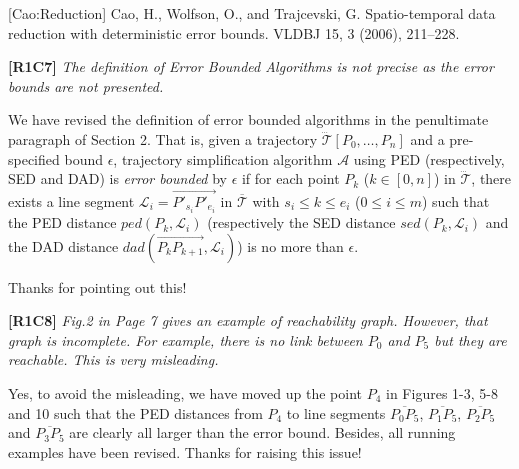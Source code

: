 \documentclass{letter}
\newcommand{\kw}[1]{{\ensuremath {\mathsf{#1}}}\xspace}
\newcommand{\ie}{\emph{i.e.,}\xspace}
\newcommand{\vv}{\overrightarrow}
\begin{document}
[Cao:Reduction] Cao, H., Wolfson, O., and Trajcevski, G. Spatio-temporal data reduction with deterministic error bounds. VLDBJ 15, 3 (2006), 211--228.




\textbf{[R1C7]} \emph{ The definition of Error Bounded Algorithms is not precise as the error bounds are not presented. }

We have revised the definition of error bounded algorithms in the penultimate paragraph of Section 2. That is, given a trajectory $\dddot{\mathcal{T}}\left[P_0, \dots, P_n\right]$ and a pre-specified bound $\epsilon$,
trajectory simplification algorithm $\mathcal{A}$ using PED (respectively, SED and DAD) is \emph{error bounded} by $\epsilon$ if for each point $P_k$ ($k\in[0,n]$) in $\dddot{\mathcal{T}}$, there exists a line segment $\mathcal{L}_i = \vv{P'_{s_i}P'_{e_i}}$ in $\overline{\mathcal{T}}$ with $s_i \le k \le e_i$ ($0\le i\le m$) such that the PED distance $ped\left(P_k, \mathcal{L}_i\right)$  (respectively the SED distance $sed\left(P_k, \mathcal{L}_i\right)$ and the DAD distance $dad\left(\vv{P_{k}P_{k+1}}, \mathcal{L}_i\right)$) is no more than  $\epsilon$.

Thanks for pointing out this!


\textbf{[R1C8]} \emph{ Fig.2 in Page 7 gives an example of reachability graph. However, that graph is incomplete. For example, there is no link between $P_0$ and $P_5$ but they are reachable. This is very misleading. }

Yes, to avoid the misleading, we have moved up the point $P_4$ in Figures 1-3, 5-8 and 10 such that the PED distances from $P_4$ to line segments $\overline{P_0P_5}$, $\overline{P_1P_5}$, $\overline{P_2P_5}$ and $\overline{P_3P_5}$ are clearly all larger than the error bound. Besides, all running examples have been revised.
Thanks for raising this issue!


\end{document}
